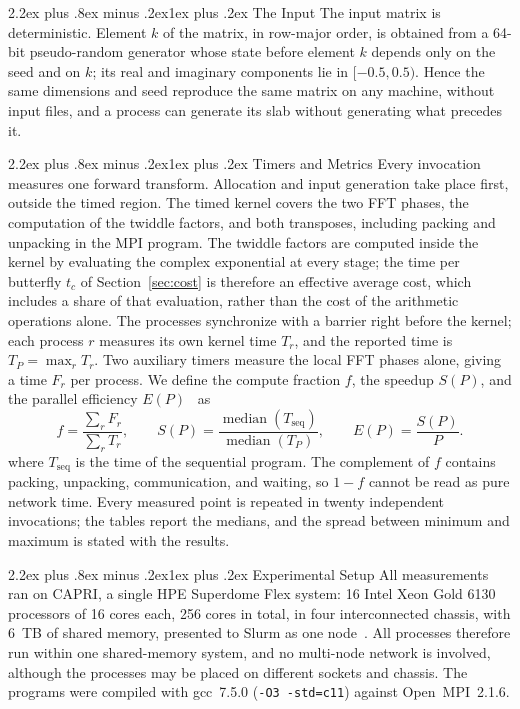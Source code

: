 \documentclass[conference,onecolumn]{IEEEtran}
\makeatletter
\renewcommand{\subsection}{\@startsection{subsection}{2}{\z@}%
  {2.2ex plus .8ex minus .2ex}{1ex plus .2ex}%
  {\normalfont\normalsize\bfseries}}
\theoremstyle{course}
\makeatother
\begin{document}
\subsection{The Input}
The input matrix is deterministic. Element $k$ of the matrix, in row-major
order, is obtained from a 64-bit pseudo-random generator whose state before
element $k$ depends only on the seed and on $k$; its real and imaginary
components lie in $[-0.5,0.5)$. Hence the same dimensions and seed
reproduce the same matrix on any machine, without input files, and a
process can generate its slab without generating what precedes it.

\subsection{Timers and Metrics}
Every invocation measures one forward transform. Allocation and input
generation take place first, outside the timed region. The timed kernel
covers the two FFT phases, the computation of the twiddle factors, and both
transposes, including packing and unpacking in the MPI program. The twiddle
factors are computed inside the kernel by evaluating the complex
exponential at every stage; the time per butterfly $t_c$ of
Section~\ref{sec:cost} is therefore an effective average cost, which
includes a share of that evaluation, rather than the cost of the arithmetic
operations alone. The processes synchronize with a barrier right before the kernel; each process
$r$ measures its own kernel time $T_r$, and the reported time is
$T_P=\max_r T_r$. Two auxiliary timers measure the local FFT phases alone,
giving a time $F_r$ per process. We define the compute fraction $f$, the
speedup $S(P)$, and the parallel efficiency $E(P)$~\cite{lab} as
\begin{equation}
 f=\frac{\sum_r F_r}{\sum_r T_r},\qquad
 S(P)=\frac{\operatorname{median}(T_{\mathrm{seq}})}{\operatorname{median}(T_P)},\qquad
 E(P)=\frac{S(P)}{P}. \label{eq:metrics}
\end{equation}
where $T_{\mathrm{seq}}$ is the time of the sequential program. The
complement of $f$ contains packing, unpacking, communication, and waiting, so $1-f$ cannot be
read as pure network time. Every measured
point is repeated in twenty independent invocations; the tables report the
medians, and the spread between minimum and maximum is stated with the
results.

\subsection{Experimental Setup}
All measurements ran on CAPRI, a single HPE Superdome Flex system: 16 Intel
Xeon Gold 6130 processors of 16 cores each, 256 cores in total, in four
interconnected chassis, with 6~TB of shared memory, presented to Slurm as
one node~\cite{capri}. All processes therefore run within one shared-memory
system, and no multi-node network is involved, although the processes may
be placed on different sockets and chassis. The programs were compiled with
gcc~7.5.0 (\texttt{-O3 -std=c11}) against Open~MPI~2.1.6.
\end{document}
